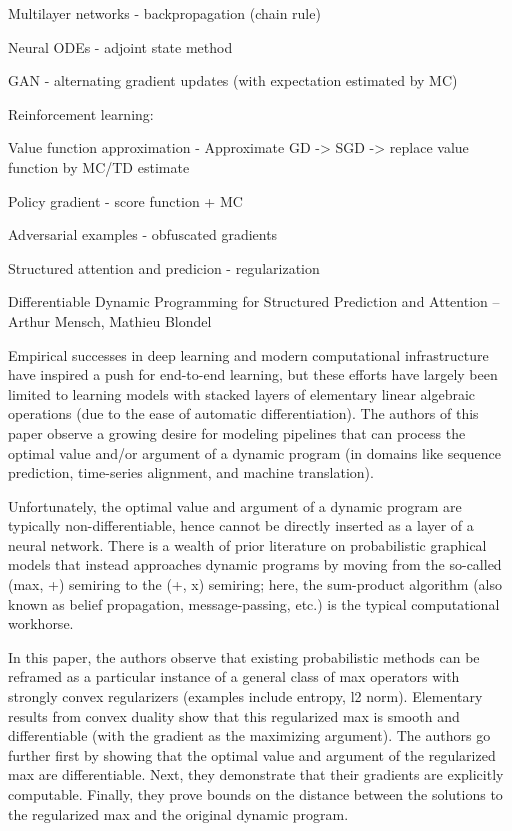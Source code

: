 \documentclass[english]{article}
\begin{document}
\item Multilayer networks - backpropagation (chain rule)

\item Neural ODEs - adjoint state method

\item GAN - alternating gradient updates (with expectation estimated by MC)

\item Reinforcement learning: 

\bitem 
\item
Value function approximation - Approximate GD -> SGD -> replace value function by MC/TD estimate
\item
Policy gradient - score function + MC
\eitem 

\item Adversarial examples - obfuscated gradients


\item Structured attention and predicion - regularization

Differentiable Dynamic Programming for Structured Prediction and Attention – Arthur Mensch, Mathieu Blondel

Empirical successes in deep learning and modern computational infrastructure have inspired a push for end-to-end learning, but these efforts have largely been limited to learning models with stacked layers of elementary linear algebraic operations (due to the ease of automatic differentiation). The authors of this paper observe a growing desire for modeling pipelines that can process the optimal value and/or argument of a dynamic program (in domains like sequence prediction, time-series alignment, and machine translation).

Unfortunately, the optimal value and argument of a dynamic program are typically non-differentiable, hence cannot be directly inserted as a layer of a neural network. There is a wealth of prior literature on probabilistic graphical models that instead approaches dynamic programs by moving from the so-called (max, +) semiring to the (+, x) semiring; here, the sum-product algorithm (also known as belief propagation, message-passing, etc.) is the typical computational workhorse.

In this paper, the authors observe that existing probabilistic methods can be reframed as a particular instance of a general class of max operators with strongly convex regularizers (examples include entropy, l2 norm). Elementary results from convex duality show that this regularized max is smooth and differentiable (with the gradient as the maximizing argument). The authors go further first by showing that the optimal value and argument of the regularized max are differentiable. Next, they demonstrate that their gradients are explicitly computable. Finally, they prove bounds on the distance between the solutions to the regularized max and the original dynamic program. 
\end{document}
